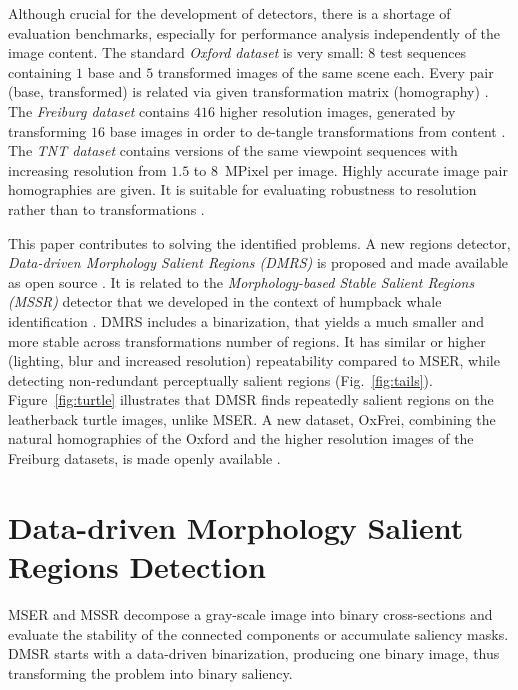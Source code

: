 \documentclass{article}
\begin{document}
Although crucial for the development of detectors, there is a shortage of evaluation benchmarks, especially for performance analysis independently of the image content. The standard {\em Oxford dataset} is very small: $8$ test sequences containing $1$ base and $5$ transformed images of the same scene each. Every pair (base, transformed) is related via given transformation matrix (homography) \cite{Mikolajczyk:2005}.  The {\em Freiburg dataset} contains $416$ higher resolution images, generated by transforming $16$ base images in order to de-tangle transformations from content \cite{FischerDB14}.  
The {\em TNT dataset} contains versions of the same viewpoint sequences with increasing resolution from $1.5$ to $8$~MPixel per image. Highly accurate image pair homographies are given. It is suitable for evaluating robustness to resolution rather than to transformations \cite{CorRos2013}. 

This paper contributes to solving the identified problems. A new regions detector, {\em Data-driven Morphology Salient Regions (DMRS)} is proposed and made available as open source \cite{elena_ranguelova_2016_45156}. It is related to the {\em Morphology-based Stable Salient Regions (MSSR)} detector that we developed in the context of humpback whale identification \cite{RangMSSR06, RangHumpb06}. DMRS includes a binarization, %
that yields a much smaller and more stable across transformations number of regions. It has similar or higher (lighting, blur and increased resolution) repeatability compared to MSER, while detecting non-redundant perceptually salient regions (Fig.~\ref{fig:tails}). Figure~\ref{fig:turtle} illustrates that DMSR finds repeatedly salient regions on the leatherback turtle images, unlike MSER. A new dataset, OxFrei, combining the natural homographies of the Oxford and the higher resolution images of the Freiburg datasets, is made openly available \cite{elena_ranguelova_2016_45156}.

\section{Data-driven Morphology Salient Regions Detection}
\label{sec:DMSR}

MSER and MSSR decompose a gray-scale image into binary cross-sections and evaluate the stability of the connected components or accumulate saliency masks. DMSR starts with a data-driven binarization, producing one binary image, thus transforming the problem into binary saliency.
\end{document}
